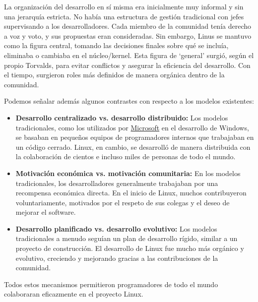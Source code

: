 \documentclass[a4paper,12pt]{article}
\begin{document}
La organización del desarrollo en sí misma era inicialmente muy informal y sin
una jerarquía estricta. No había una estructura de gestión tradicional con jefes
supervisando a los desarrolladores. Cada miembro de la comunidad tenía derecho a
voz y voto, y sus propuestas eran consideradas. Sin embargo, Linus se
mantuvo como la figura central, tomando las decisiones finales sobre qué se
incluía, eliminaba o cambiaba en el núcleo/kernel. Esta figura de `general'
surgió, según el propio Torvalds, para evitar conflictos y asegurar la
eficiencia del desarrollo.  Con el tiempo, surgieron roles más definidos de
manera orgánica dentro de la comunidad.

Podemos señalar además algunos contrastes con respecto a los modelos existentes:

\begin{itemize}
    \item \textbf{Desarrollo centralizado vs. desarrollo distribuido:} 
        Los modelos tradicionales, como los utilizados por \hyperref[microsoft]{Microsoft} en el
        desarrollo de Windows, se basaban en pequeños equipos de programadores
        internos que trabajaban en un código cerrado. Linux, en cambio, se
        desarrolló de manera distribuida con la colaboración de cientos e
        incluso miles de personas de todo el mundo.
    \item \textbf{Motivación económica vs. motivación comunitaria:}  En los
    modelos tradicionales, los desarrolladores generalmente trabajaban por una
    recompensa económica directa. En el inicio de Linux, muchos contribuyeron
    voluntariamente, motivados por el respeto de sus colegas y el deseo de
    mejorar el software.
    \item \textbf{Desarrollo planificado vs. desarrollo evolutivo:} Los modelos
    tradicionales a menudo seguían un plan de desarrollo rígido, similar a un
    proyecto de construcción. El desarrollo de Linux fue mucho más orgánico y
    evolutivo, creciendo y mejorando gracias a las contribuciones de la comunidad.
\end{itemize}

Todos estos mecanismos permitieron programadores de todo el mundo colaboraran
eficazmente en el proyecto Linux.
\end{document}
